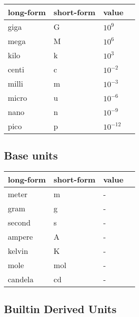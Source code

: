 \documentclass{article}
\begin{document}
\begin{center}
    \begin{tabular}{ | l | l |  l | p{5cm} |}
    \hline
    long-form & short-form & value  \\ \hline
    giga & G & $10^9$ \\ \hline
    mega & M & $10^6$ \\ \hline
    kilo & k & $10^3$ \\ \hline
    centi & c & $10^{-2}$ \\ \hline
    milli & m & $10^{-3}$ \\ \hline
    micro & u & $10^{-6}$ \\ \hline
    nano & n & $10^{-9}$ \\ \hline
    pico & p & $10^{-12}$ \\ \hline
    \end{tabular}
\end{center}


\subsection*{Base units}

\begin{center}
    \begin{tabular}{ | l | l |  l | p{5cm} |}
    \hline
    long-form & short-form & value  \\ \hline
    meter & m & - \\ \hline
    gram & g & - \\ \hline
    second & s & - \\ \hline
    ampere & A & - \\ \hline
    kelvin & K & - \\ \hline
    mole & mol & - \\ \hline
    candela & cd & - \\ \hline
    \end{tabular}
\end{center}

\subsection{Builtin Derived Units}
\end{document}

